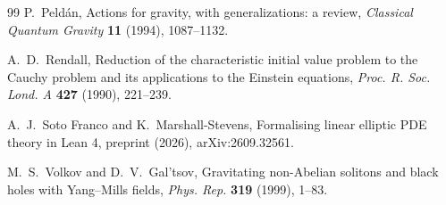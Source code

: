 \documentclass[11pt]{amsart}
\theoremstyle{definition}
\theoremstyle{remark}
\begin{document}
\begin{thebibliography}{99}
P.~Peld\'an, Actions for gravity, with generalizations: a review, \emph{Classical Quantum Gravity} \textbf{11} (1994), 1087--1132.

A.~D.~Rendall, Reduction of the characteristic initial value problem to the Cauchy problem and its applications to the Einstein equations, \emph{Proc. R. Soc. Lond. A} \textbf{427} (1990), 221--239.

A.~J.~Soto Franco and K.~Marshall-Stevens, Formalising linear elliptic PDE theory in Lean 4, preprint (2026), arXiv:2609.32561.

M.~S.~Volkov and D.~V.~Gal'tsov, Gravitating non-Abelian solitons and black holes with Yang--Mills fields, \emph{Phys. Rep.} \textbf{319} (1999), 1--83.

\end{thebibliography}
\end{document}

